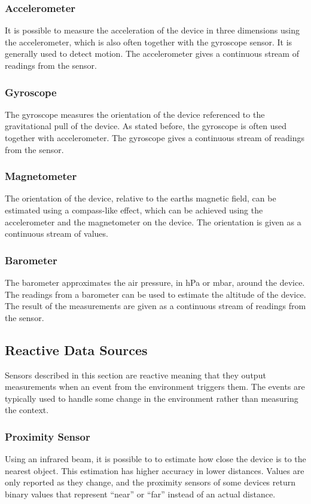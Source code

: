 \subsubsection{Accelerometer}
\label{sub:accelerometer}
It is possible to measure the acceleration of the device in three dimensions using the accelerometer, which is also often together with the gyroscope sensor. It is generally used to detect motion. The accelerometer gives a continuous stream of readings from the sensor.

\subsubsection{Gyroscope}
\label{sub:gyroscope}
The gyroscope measures the orientation of the device referenced to the gravitational pull of the device. As stated before, the gyroscope is often used together with accelerometer. The gyroscope gives a continuous stream of readings from the sensor.

\subsubsection{Magnetometer}
\label{sub:compass}
The orientation of the device, relative to the earths magnetic field, can be estimated using a compass-like effect, which can be achieved using the accelerometer and the magnetometer on the device. The orientation is given as a continuous stream of values.

\subsubsection{Barometer}
\label{sub:barometer}
The barometer approximates the air pressure, in hPa or mbar, around the device. The readings from a barometer can be used to estimate the altitude of the device. The result of the measurements are given as a continuous stream of readings from the sensor. 

\subsection{Reactive Data Sources}
\label{sub:on_change_reporting_sensors}
Sensors described in this section are reactive meaning that they output measurements when an event from the environment triggers them. The events are typically used to handle some change in the environment rather than measuring the context.

\subsubsection{Proximity Sensor}
\label{sub:proximity_sensor}
Using an infrared beam, it is possible to to estimate how close the device is to the nearest object. This estimation has higher accuracy in lower distances. Values are only reported as they change, and the proximity sensors of some devices return binary values that represent ``near'' or ``far'' instead of an actual distance.

